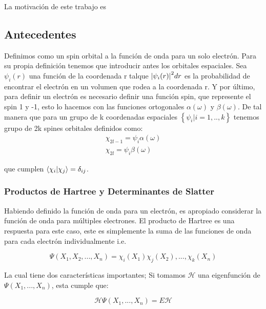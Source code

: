\documentclass[12pt, oneside]{article}
\begin{document}
La motivación de este trabajo es

\subsection{Antecedentes}

Definimos como un spin orbital a la función de onda para un solo electrón. Para su propia definición tenemos que introducir antes los orbitales espaciales. Sea $\psi_i(r)$ una función de la coordenada r talque $\abs{\psi_i(r)}^2dr$ es la probabilidad de encontrar el electrón en un volumen que rodea a la coordenada r. Y por último, para definir un electrón es necesario definir una función spin, que represente el spin 1 y -1, esto lo hacemos con las funciones ortogonales $\alpha(\omega)$ y $\beta(\omega)$. De tal manera que para un grupo de k coordenadas espaciales $\left\{ \psi_i | i=1,..,k\right\}$ tenemos grupo de 2k spines orbitales definidos como:
\begin{equation}
    \begin{split}
        \chi_{2l-1}=\psi_i\alpha(\omega)  \\
        \chi_{2l}=\psi_i\beta(\omega)
    \end{split}
\end{equation}

que cumplen $\braket{\chi_i}{\chi_j}=\delta_{ij}$.\\

\subsubsection{Productos de Hartree y Determinantes de Slatter}

Habiendo definido la función de onda para un electrón, es apropiado considerar la función de onda para múltiples electrones. El producto de Hartree es una respuesta para este caso, este es simplemente la suma de las funciones de onda para cada electrón individualmente i.e.

\begin{equation}
    \Psi(X_1,X_2,...,X_n)=\chi_i(X_1)\chi_j(X_2),...,\chi_k(X_n)
\end{equation}

La cual tiene dos características importantes; Si tomamos $\mathscr{H}$ una eigenfunción de $\Psi(X_1,...,X_n)$, esta cumple que:

\begin{equation}
    \mathscr{H}\Psi(X_1,...,X_n)=E\mathscr{H}
\end{equation}
\end{document}
